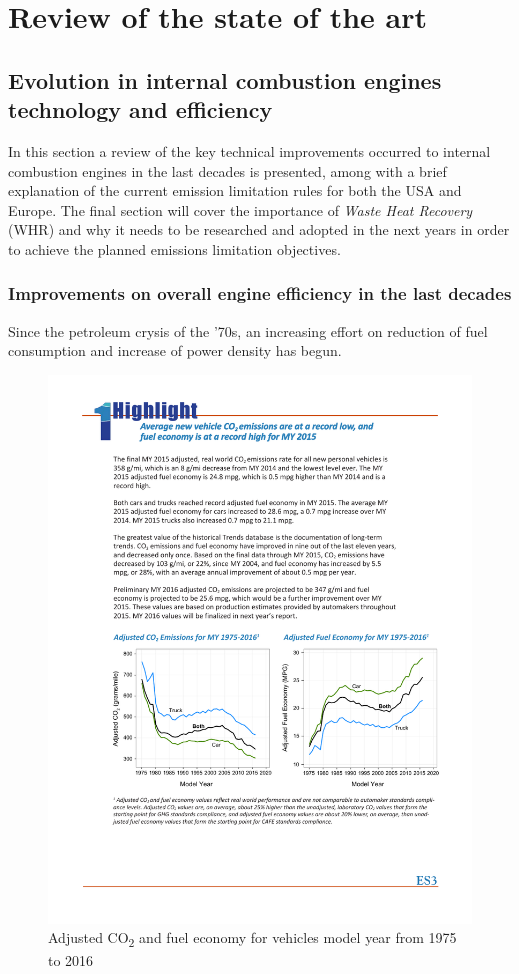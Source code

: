 \chapter{Review of the state of the art}

\section{Evolution in internal combustion engines technology and efficiency}

In this section a review of the key technical improvements occurred to internal combustion engines in the last decades is presented, among with a brief explanation of the current emission limitation rules for both the USA and Europe. The final section will cover the importance of \emph{Waste Heat Recovery} (WHR) and why it needs to be researched and adopted in the next years in order to achieve the planned emissions limitation objectives.

\subsection{Improvements on overall engine efficiency in the last decades}

Since the petroleum crysis of the '70s, an increasing effort on reduction of fuel consumption and increase of power density has begun.

\begin{figure}[ht]
  \centering
  \includegraphics[width=\textwidth]{figures/review/adj_fuel_economy.pdf}
  \caption{Adjusted CO\textsubscript{2} and fuel economy for vehicles model year from 1975 to 2016\label{fig:adj_fuel_economy} }
\end{figure}

